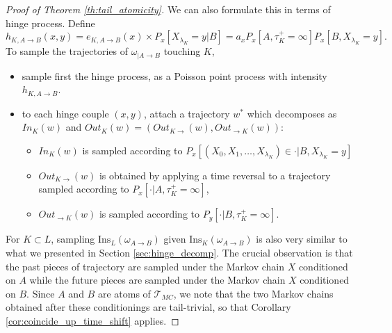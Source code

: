 \documentclass[12pt,a4paper]{article}
\newcommand{\1}[1]{{\mathbf 1}{\{#1\}}}
\newcommand{\8}{{\infty}}
\newcommand{\In}{\mathrm{Ins}}
\begin{document}
\begin{proof}[Proof of Theorem \ref{th:tail_atomicity}]
We can also formulate this in terms of hinge process. Define 
\begin{equation}
h_{K, A\to B}(x, y)= e_{K, A\to B}(x) \times P_x[X_{\lambda_K}= y | B ] = a_x P_x[A, \tau_K^+=\infty]  P_x[B, X_{\lambda_K}= y] .
\end{equation}
To sample the trajectories of $\omega_{|A\to B}$ touching $K$,
\begin{itemize}
\item sample first the hinge process, as a Poisson point process with intensity $h_{K, A\to B}$.
\item to each hinge couple $(x, y)$, attach a trajectory $w^*$ which decomposes as $In_K(w)$ and $Out_K(w)=(Out_{K\rightarrow} (w), Out_{\rightarrow K}(w))$:
\begin{itemize}
\item $In_K(w)$ is sampled according to $P_x[ (X_0, X_1, \dots, X_{\lambda_K})\in \cdot | B, X_{\lambda_K}=y]$ 
\item $Out_{K\rightarrow} (w)$ is obtained by applying a time reversal to a trajectory sampled according to $P_x[ \cdot | A, \tau^+_K=\infty]$,
\item $Out_{\rightarrow K}(w)$ is sampled according to $P_y[ \cdot | B, \tau^+_K=\infty]$.
\end{itemize} 
\end{itemize}
For $K\subset L$, sampling $\In_L(\omega_{A\to B})$ given $\In_K(\omega_{A\to B})$ is also very similar to what we presented in Section \ref{sec:hinge_decomp}. 
The crucial observation is that the past pieces of trajectory are sampled under the Markov chain $X$ conditioned on $A$ while the future pieces are sampled under the Markov chain $X$ conditioned on $B$. Since $A$ and $B$ are atoms of $\mathcal{T}_{MC}$, we note that the two Markov chains obtained after these conditionings are tail-trivial, so that Corollary \ref{cor:coincide_up_time_shift} applies.

\smallskip


\end{proof}
\end{document}
